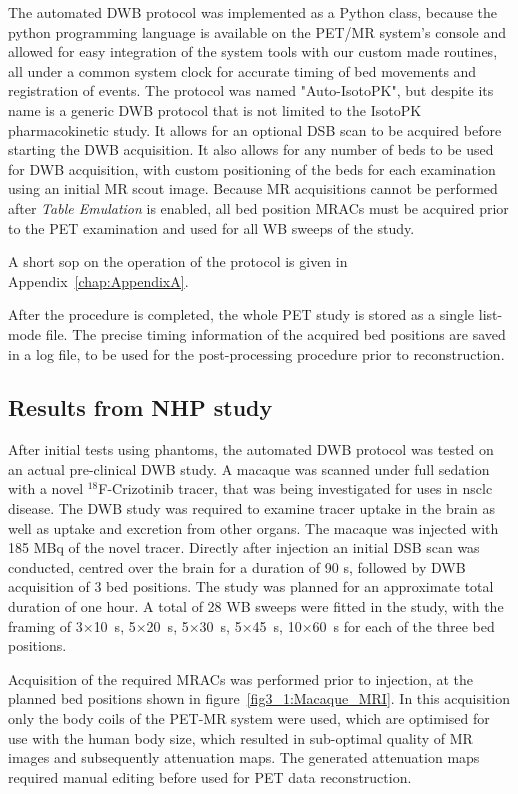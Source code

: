 The automated DWB protocol was implemented as a Python class, because the python programming language is available on the PET/MR system's console and allowed for easy integration of the system tools with our custom made routines, all under a common system clock for accurate timing of bed movements and registration of events.
The protocol was named "Auto-IsotoPK", but despite its name is a generic DWB protocol that is not limited to the IsotoPK pharmacokinetic study. It allows for an optional DSB scan to be acquired before starting the DWB acquisition. It also allows for any number of beds to be used for DWB acquisition, with custom positioning of the beds for each examination using an initial MR scout image. 
Because MR acquisitions cannot be performed after \textit{Table Emulation} is enabled, all bed position MRACs must be acquired prior to the PET examination and used for all WB sweeps of the study.

A short \gls{sop} on the operation of the protocol is given in Appendix~\ref{chap:AppendixA}.

After the procedure is completed, the whole PET study is stored as a single list-mode file. The precise timing information of the acquired bed positions are saved in a log file, to be used for the post-processing procedure prior to reconstruction.  

\subsection{Results from NHP study}
After initial tests using phantoms, the automated DWB protocol was tested on an actual pre-clinical DWB study. A macaque was scanned under full sedation with a novel $^{18}$F-Crizotinib tracer, that was being investigated for uses in \gls{nsclc} disease. The DWB study was required to examine tracer uptake in the brain as well as uptake and excretion from other organs. The macaque was injected with 185 \si{\mega \becquerel} of the novel tracer. Directly after injection an initial DSB scan was conducted, centred over the brain for a duration of 90 s, followed by DWB acquisition of 3 bed positions. The study was planned for an approximate total duration of one hour. A total of 28 WB sweeps were fitted in the study, with the framing of 3$\times$10~\si{\s}, 5$\times$20~\si{\s}, 5$\times$30~\si{\s}, 5$\times$45~\si{\s}, 10$\times$60~\si{\s} for each of the three bed positions.

Acquisition of the required MRACs was performed prior to injection, at the planned bed positions shown in figure~\ref{fig3_1:Macaque_MRI}. In this acquisition only the body coils of the PET-MR system were used, which are optimised for use with the human body size, which resulted in sub-optimal quality of MR images and subsequently attenuation maps. The generated attenuation maps required manual editing before used for PET data reconstruction.

